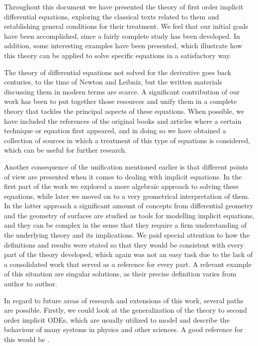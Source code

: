 %
%
%

Throughout this document we have presented the theory of first order implicit differential equations, exploring the classical texts related to them and establishing general conditions for their treatment. We feel that our initial goals have been accomplished, since a fairly complete study has been developed. In addition, some interesting examples have been presented, which illustrate how this theory can be applied to solve specific equations in a satisfactory way.

The theory of differential equations not solved for the derivative goes back centuries, to the time of Newton and Leibniz, but the written materials discussing them in modern terms are scarce. A significant contribution of our work has been to put together those resources and unify them in a complete theory that tackles the principal aspects of these equations. When possible, we have included the references of the original books and articles where a certain technique or equation first appeared, and in doing so we have obtained a collection of sources in which a treatment of this type of equations is considered, which can be useful for further research.

Another consequence of the unification mentioned earlier is that different points of view are presented when it comes to dealing with implicit equations. In the first part of the work we explored a more algebraic approach to solving these equations, while later we moved on to a very geometrical interpretation of them. In the latter approach a significant amount of concepts from differential geometry and the geometry of surfaces are studied as tools for modelling implicit equations, and they can be complex in the sense that they require a firm understanding of the underlying theory and its implications. We paid special attention to how the definitions and results were stated so that they would be consistent with every part of the theory developed, which again was not an easy task due to the lack of a consolidated work that served as a reference for every part. A relevant example of this situation are singular solutions, as their precise definition varies from author to author.

In regard to future areas of research and extensions of this work, several paths are possible. Firstly, we could look at the generalization of the theory to second order implicit ODEs, which are usually utilized to model and describe the behaviour of many systems in physics and other sciences. A good reference for this would be \cite{takahashi2007implicit}.

